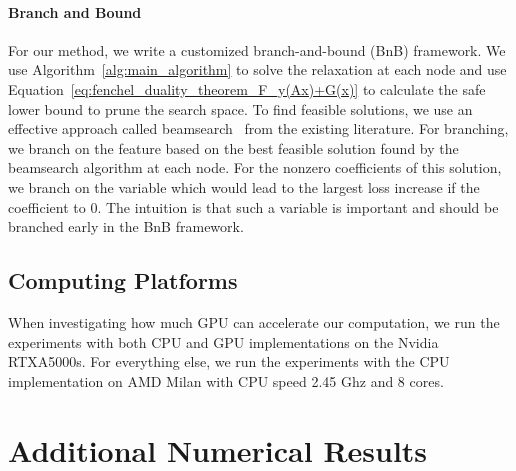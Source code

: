 \paragraph{Branch and Bound}
For our method, we write a customized branch-and-bound (BnB) framework.
We use Algorithm~\ref{alg:main_algorithm} to solve the relaxation at each node and use Equation~\eqref{eq:fenchel_duality_theorem_F_y(Ax)+G(x)} to calculate the safe lower bound to prune the search space.
To find feasible solutions, we use an effective approach called beamsearch~\cite{liu2022fasterrisk} from the existing literature.
For branching, we branch on the feature based on the best feasible solution found by the beamsearch algorithm at each node.
For the nonzero coefficients of this solution, we branch on the variable which would lead to the largest loss increase if the coefficient to $0$.
The intuition is that such a variable is important and should be branched early in the BnB framework.

\subsection{Computing Platforms}
When investigating how much GPU can accelerate our computation, we run the experiments with both CPU and GPU implementations on the Nvidia RTXA5000s.
For everything else, we run the experiments with the CPU implementation on AMD Milan with CPU speed 2.45 Ghz and 8 cores.

\section{Additional Numerical Results}
\label{appendix:numerical}





